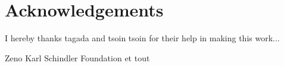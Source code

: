 \section*{Acknowledgements}

I hereby thanks tagada and tsoin tsoin for their help in making this work...

Zeno Karl Schindler Foundation et tout

